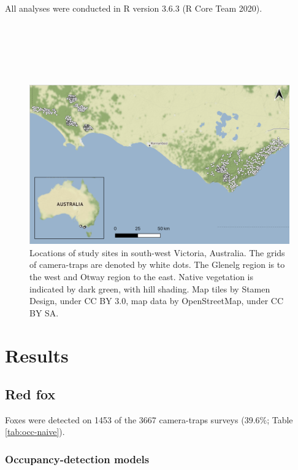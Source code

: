 \documentclass[11pt,a4paper,titlepage,twoside,openright]{style/unimelbthesis}
\begin{document}
\begin{mainmatter}
All analyses were conducted in R version 3.6.3 (R Core Team 2020).

\newpage

\(~\)

\(~\)

\(~\)
\begin{figure}

{\centering \includegraphics[width=1\linewidth]{figure/map_cams} 

}

\caption{Locations of study sites in south-west Victoria, Australia. The grids of camera-traps are denoted by white dots. The Glenelg region is to the west and Otway region to the east. Native vegetation is indicated by dark green, with hill shading. Map tiles by Stamen Design, under CC BY 3.0, map data by OpenStreetMap, under CC BY SA.}\label{fig:occ-map}
\end{figure}
\newpage

\hypertarget{results-1}{%
\section{Results}\label{results-1}}

\hypertarget{red-fox-1}{%
\subsection{Red fox}\label{red-fox-1}}

Foxes were detected on 1453 of the 3667 camera-traps surveys (39.6\%; Table \ref{tab:occ-naive}).

\hypertarget{occupancy-detection-models-1}{%
\subsubsection{Occupancy-detection models}\label{occupancy-detection-models-1}}


\end{mainmatter}
\end{document}
